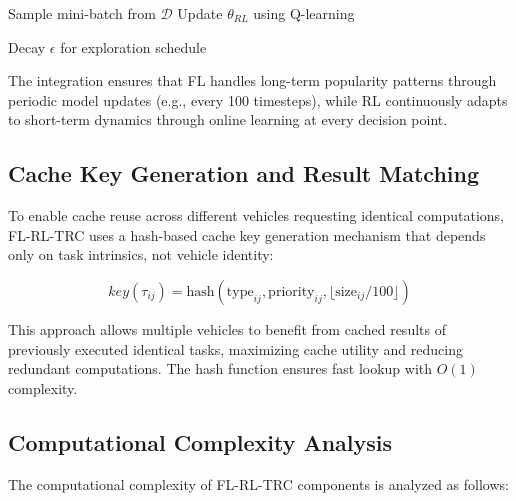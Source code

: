 \begin{algorithm}[t!]
{{{{{                    
                    Sample mini-batch from $\mathcal{D}$\;
                    Update $\theta_{RL}$ using Q-learning\;
                }
            }
        }
        
        Decay $\epsilon$ for exploration schedule\;
    }
    
}
\end{algorithm}

The integration ensures that FL handles long-term popularity patterns through periodic model updates (e.g., every 100 timesteps), while RL continuously adapts to short-term dynamics through online learning at every decision point.

\subsection{Cache Key Generation and Result Matching}

To enable cache reuse across different vehicles requesting identical computations, FL-RL-TRC uses a hash-based cache key generation mechanism that depends only on task intrinsics, not vehicle identity:

\begin{equation}
key(\tau_{ij}) = \text{hash}(\text{type}_{ij}, \text{priority}_{ij}, \lfloor \text{size}_{ij}/100 \rfloor)
\end{equation}

This approach allows multiple vehicles to benefit from cached results of previously executed identical tasks, maximizing cache utility and reducing redundant computations. The hash function ensures fast lookup with $O(1)$ complexity.

\subsection{Computational Complexity Analysis}

The computational complexity of FL-RL-TRC components is analyzed as follows:

